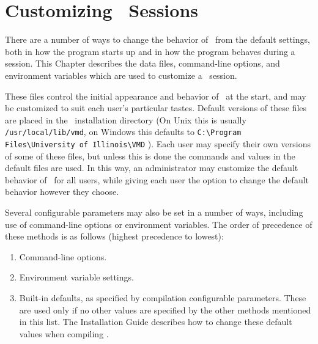 %
%
%
\chapter{Customizing \VMD\ Sessions}
\label{ug:topic:customizing}
There are a number of ways to change the behavior of \VMD\ from the
default settings, both in how the program starts up and in how the
program behaves during a session.  This Chapter describes the data files,
command-line options, and environment variables which are used to
customize a \VMD\ session.

These files control the initial appearance and behavior of \VMD\ at
the start, and may be customized to suit each user's particular tastes.
Default versions of these files are placed in the \VMD\ installation
directory (On Unix this is usually {\tt /usr/local/lib/vmd}, on Windows
this defaults to {\tt \verb+C:\Program Files\University of Illinois\VMD+} ).  
Each user may specify
their own versions of some of these files, but unless this is done the
commands and values in the default files are used.  In this way, an
administrator may customize the default behavior of \VMD\ for all
users, while giving each user the option to change the default
behavior however they choose.

Several configurable parameters may also be set in a number of ways,
including use of command-line options or environment variables.  The
order of precedence of these methods is as follows (highest precedence
to lowest):

\begin{enumerate}
  \item Command-line options.
  \item Environment variable settings.
  \item Built-in defaults, as specified by compilation configurable
parameters.  These are used only if no other values are specified by
the other methods mentioned in this list.  The Installation Guide
describes how to change these default values when compiling \VMD.
\end{enumerate}

